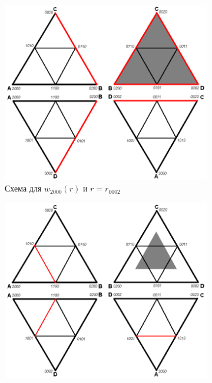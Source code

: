 \begin{figure}[h]
\begin{subfigure}[b]{0.5\textwidth}
\centering
\includegraphics[width=\textwidth]{png/tetr-interp-2nd-order-2.png}
\caption{Схема для $w_{2000}(r)$ и $r = r_{0002}$}
\end{subfigure}
\begin{subfigure}[b]{0.5\textwidth}
\centering
\includegraphics[width=\textwidth]{png/tetr-interp-2nd-order-3.png}

\end{subfigure}
\end{figure}
